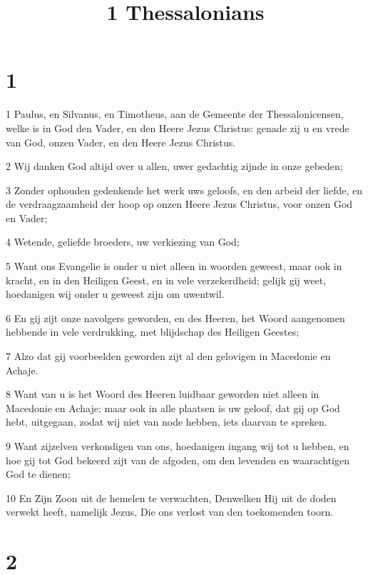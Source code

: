 

\title{1 Thessalonians}



\chapter{1}

\par 1 Paulus, en Silvanus, en Timotheus, aan de Gemeente der Thessalonicensen, welke is in God den Vader, en den Heere Jezus Christus: genade zij u en vrede van God, onzen Vader, en den Heere Jezus Christus.
\par 2 Wij danken God altijd over u allen, uwer gedachtig zijnde in onze gebeden;
\par 3 Zonder ophouden gedenkende het werk uws geloofs, en den arbeid der liefde, en de verdraagzaamheid der hoop op onzen Heere Jezus Christus, voor onzen God en Vader;
\par 4 Wetende, geliefde broeders, uw verkiezing van God;
\par 5 Want ons Evangelie is onder u niet alleen in woorden geweest, maar ook in kracht, en in den Heiligen Geest, en in vele verzekerdheid; gelijk gij weet, hoedanigen wij onder u geweest zijn om uwentwil.
\par 6 En gij zijt onze navolgers geworden, en des Heeren, het Woord aangenomen hebbende in vele verdrukking, met blijdschap des Heiligen Geestes;
\par 7 Alzo dat gij voorbeelden geworden zijt al den gelovigen in Macedonie en Achaje.
\par 8 Want van u is het Woord des Heeren luidbaar geworden niet alleen in Macedonie en Achaje; maar ook in alle plaatsen is uw geloof, dat gij op God hebt, uitgegaan, zodat wij niet van node hebben, iets daarvan te spreken.
\par 9 Want zijzelven verkondigen van ons, hoedanigen ingang wij tot u hebben, en hoe gij tot God bekeerd zijt van de afgoden, om den levenden en waarachtigen God te dienen;
\par 10 En Zijn Zoon uit de hemelen te verwachten, Denwelken Hij uit de doden verwekt heeft, namelijk Jezus, Die ons verlost van den toekomenden toorn.

\chapter{2}

